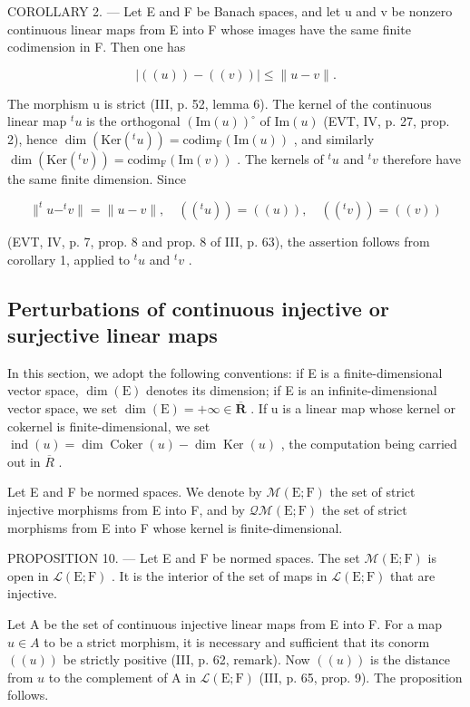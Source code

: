 COROLLARY 2. --- Let E and F be Banach spaces, and let u and v be nonzero continuous linear maps from E into F whose images have the same finite codimension in F. Then one has

\[
| ((u)) - ((v)) | \leqslant \| u - v \|.
\]

The morphism u is strict (III, p. 52, lemma 6). The kernel of the continuous linear map \({}^{t}u\) is the orthogonal \((\mathrm{Im}(u))^{\circ}\) of \(\mathrm{Im}(u)\) (EVT, IV, p. 27, prop. 2), hence \(\dim(\mathrm{Ker}({}^{t}u)) = \mathrm{codim}_{\mathrm{F}}(\mathrm{Im}(u))\) , and similarly \(\dim(\mathrm{Ker}({}^{t}v)) = \mathrm{codim}_{\mathrm{F}}(\mathrm{Im}(v))\) . The kernels of \({}^{t}u\) and \({}^{t}v\) therefore have the same finite dimension. Since

\[
\| ^ {t} u - ^ {t} v \| = \| u - v \|, \quad ((^ {t} u)) = ((u)), \quad ((^ {t} v)) = ((v))
\]

(EVT, IV, p. 7, prop. 8 and prop. 8 of III, p. 63), the assertion follows from corollary 1, applied to \(^{t}u\) and \(^{t}v\) .

\subsection{Perturbations of continuous injective or surjective linear maps}

In this section, we adopt the following conventions: if E is a finite-dimensional vector space, \(\dim(\mathrm{E})\) denotes its dimension; if E is an infinite-dimensional vector space, we set \(\dim(\mathrm{E}) = +\infty \in \overline{\mathbf{R}}\) . If u is a linear map whose kernel or cokernel is finite-dimensional, we set \(\operatorname{ind}(u) = \dim \operatorname{Coker}(u) - \dim \operatorname{Ker}(u)\) , the computation being carried out in \(\overline{R}\) .

Let E and F be normed spaces. We denote by \(\mathcal{M}(\mathrm{E};\mathrm{F})\) the set of strict injective morphisms from E into F, and by \(\mathcal{Q}\mathcal{M}(\mathrm{E};\mathrm{F})\) the set of strict morphisms from E into F whose kernel is finite-dimensional.

PROPOSITION 10. --- Let E and F be normed spaces. The set \(\mathcal{M}(\mathrm{E};\mathrm{F})\) is open in \(\mathcal{L}(\mathrm{E};\mathrm{F})\) . It is the interior of the set of maps in \(\mathcal{L}(\mathrm{E};\mathrm{F})\) that are injective.

Let A be the set of continuous injective linear maps from E into F. For a map \(u \in A\) to be a strict morphism, it is necessary and sufficient that its conorm \(((u))\) be strictly positive (III, p. 62, remark). Now \(((u))\) is the distance from \(u\) to the complement of A in \(\mathcal{L}(\mathrm{E};\mathrm{F})\) (III, p. 65, prop. 9). The proposition follows.

